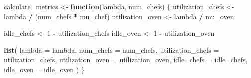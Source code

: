 \documentclass[
]{article}
\newenvironment{Shaded}{\begin{snugshade}}{\end{snugshade}}
\newcommand{\AttributeTok}[1]{\textcolor[rgb]{0.13,0.29,0.53}{#1}}
\newcommand{\ControlFlowTok}[1]{\textcolor[rgb]{0.13,0.29,0.53}{\textbf{#1}}}
\newcommand{\DecValTok}[1]{\textcolor[rgb]{0.00,0.00,0.81}{#1}}
\newcommand{\FunctionTok}[1]{\textcolor[rgb]{0.13,0.29,0.53}{\textbf{#1}}}
\newcommand{\NormalTok}[1]{#1}
\newcommand{\OtherTok}[1]{\textcolor[rgb]{0.56,0.35,0.01}{#1}}
\newcommand{\SpecialCharTok}[1]{\textcolor[rgb]{0.81,0.36,0.00}{\textbf{#1}}}
\begin{document}
\begin{Shaded}
\begin{Highlighting}[]
\NormalTok{calculate\_metrics }\OtherTok{\textless{}{-}} \ControlFlowTok{function}\NormalTok{(lambda, num\_chefs) \{}
\NormalTok{  utilization\_chefs }\OtherTok{\textless{}{-}}\NormalTok{ lambda }\SpecialCharTok{/}\NormalTok{ (num\_chefs }\SpecialCharTok{*}\NormalTok{ mu\_chef)}
\NormalTok{  utilization\_oven }\OtherTok{\textless{}{-}}\NormalTok{ lambda }\SpecialCharTok{/}\NormalTok{ mu\_oven}

\NormalTok{  idle\_chefs }\OtherTok{\textless{}{-}} \DecValTok{1} \SpecialCharTok{{-}}\NormalTok{ utilization\_chefs}
\NormalTok{  idle\_oven }\OtherTok{\textless{}{-}} \DecValTok{1} \SpecialCharTok{{-}}\NormalTok{ utilization\_oven}

  \FunctionTok{list}\NormalTok{(}
    \AttributeTok{lambda =}\NormalTok{ lambda,}
    \AttributeTok{num\_chefs =}\NormalTok{ num\_chefs,}
    \AttributeTok{utilization\_chefs =}\NormalTok{ utilization\_chefs,}
    \AttributeTok{utilization\_oven =}\NormalTok{ utilization\_oven,}
    \AttributeTok{idle\_chefs =}\NormalTok{ idle\_chefs,}
    \AttributeTok{idle\_oven =}\NormalTok{ idle\_oven}
\NormalTok{  )}
\NormalTok{\}}
\end{Highlighting}
\end{Shaded}
\end{document}
